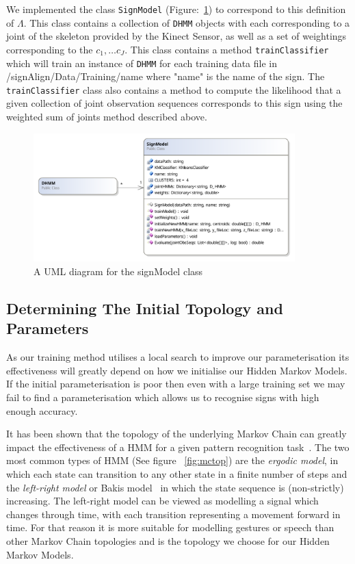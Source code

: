 We implemented the class \verb|SignModel| (Figure:~\ref{fig:signModel}) to correspond to this definition of $\Lambda$. This class contains a collection of \verb|DHMM| objects with each corresponding to a joint of the skeleton provided by the Kinect Sensor, as well as a set of weightings corresponding to the $c_1, \dots c_J$. This class contains a method \verb|trainClassifier| which will train an instance of \verb|DHMM| for each training data file in /signAlign/Data/Training/name where "name" is the name of the sign. The \verb|trainClassifier| class also contains a method to compute the likelihood that a given collection of joint observation sequences corresponds to this sign using the weighted sum of joints method described above.
\begin{figure}
        \centering
        \includegraphics[width=0.9\textwidth]{ThesisFigs/signModelDiag}
        \caption{A UML diagram for the signModel class}\label{fig:signModel}
\end{figure}

\subsection{Determining The Initial Topology and Parameters}
As our training method utilises a local search to improve our parameterisation its effectiveness will greatly depend on how we initialise our Hidden Markov Models. If the initial parameterisation is poor then even with a large training set we may fail to find a parameterisation which allows us to recognise signs with high enough accuracy.

It has been shown that the topology of the underlying Markov Chain can greatly impact the effectiveness of a HMM for a given pattern recognition task~\citep{rabiner1989tutorial, jelinek1998statistical}. The two most common types of HMM (See figure ~\ref{fig:mctop}) are the \emph{ergodic model}, in which each state can transition to any other state in a finite number of steps and the \emph{left-right model} or Bakis model~\citep{bakis1976continuous} in which the state sequence is (non-strictly) increasing. The left-right model can be viewed as modelling a signal which changes through time, with each transition representing a movement forward in time. For that reason it is more suitable for modelling gestures or speech than other Markov Chain topologies and is the topology we choose for our Hidden Markov Models.

